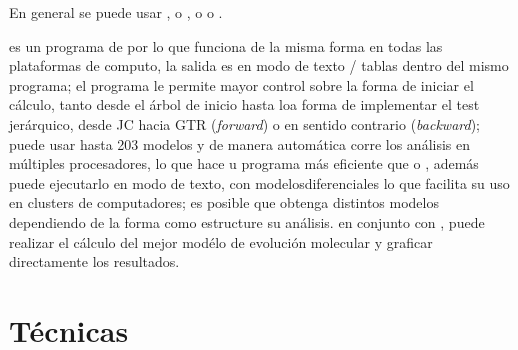 {En general se puede usar , o , o  o . 
 

 es un programa de  por lo que funciona de la misma forma en todas las plataformas de computo, la  salida es en modo de texto / tablas dentro del mismo programa; el programa le permite mayor control sobre la forma de iniciar el c\'alculo, tanto desde el \'arbol de inicio hasta loa forma de implementar el test jer\'arquico, desde JC hacia GTR (\textit{forward}) o en sentido contrario  (\textit{backward}); 
puede usar hasta 203 modelos y de manera  autom\'atica corre los an\'alisis en m\'ultiples procesadores, lo que hace u programa m\'as eficiente que  o , adem\'as puede ejecutarlo en modo de texto, con modelosdiferenciales lo que facilita su uso en clusters de computadores; es posible que obtenga distintos modelos dependiendo de la forma como estructure su an\'alisis.  en conjunto con ,  puede realizar el c\'alculo del mejor mod\'elo de evoluci\'on molecular y graficar directamente los resultados.


\section*{T\'ecnicas}

%
\noindent

}
